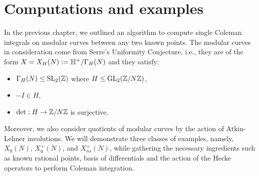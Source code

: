 \chapter{Computations and examples}

In the previous chapter, we outlined an algorithm to compute single Coleman integrals on modular curves between any two known points. The modular curves in consideration come from Serre's Uniformity Conjecture, i.e., they are of the form $X = X_H(N) := \mathbb{H}^+/\Gamma_H(N)$ and they satisfy:

\begin{itemize}
\item $\Gamma_H(N) \leq \operatorname{SL}_2(\mathbb{Z})$ where $H \leq \operatorname{GL}_2(\mathbb{Z}/N\mathbb{Z})$,
\item $- I \in H$,
\item $\det: H \rightarrow \mathbb{Z}/N\mathbb{Z}$ is surjective.
\end{itemize}

Moreover, we also consider quotients of modular curves by the action of Atkin-Lehner involutions. We will demonstrate three classes of examples, namely, $X_0(N)$, $X_0^+(N)$, and $X_{ns}^+(N)$, while gathering the necessary ingredients such as known rational points, basis of differentials and the action of the Hecke operators to perform Coleman integration.